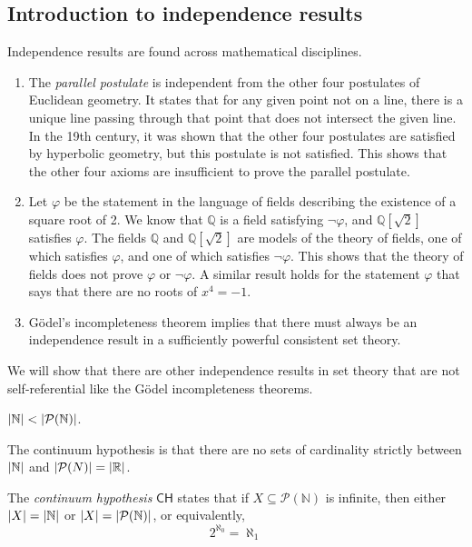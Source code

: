 \subsection{Introduction to independence results}
Independence results are found across mathematical disciplines.
\begin{enumerate}
    \item The \emph{parallel postulate} is independent from the other four postulates of Euclidean geometry.
    It states that for any given point not on a line, there is a unique line passing through that point that does not intersect the given line.
    In the 19th century, it was shown that the other four postulates are satisfied by hyperbolic geometry, but this postulate is not satisfied.
    This shows that the other four axioms are insufficient to prove the parallel postulate.
    \item Let \( \varphi \) be the statement in the language of fields describing the existence of a square root of 2.
    We know that \( \mathbb Q \) is a field satisfying \( \neg\varphi \), and \( \mathbb Q[\sqrt{2}] \) satisfies \( \varphi \).
    The fields \( \mathbb Q \) and \( \mathbb Q[\sqrt{2}] \) are models of the theory of fields, one of which satisfies \( \varphi \), and one of which satisfies \( \neg\varphi \).
    This shows that the theory of fields does not prove \( \varphi \) or \( \neg\varphi \).
    A similar result holds for the statement \( \varphi \) that says that there are no roots of \( x^4 = -1 \).
    \item G\"odel's incompleteness theorem implies that there must always be an independence result in a sufficiently powerful consistent set theory.
\end{enumerate}
We will show that there are other independence results in set theory that are not self-referential like the G\"odel incompleteness theorems.
\begin{theorem}[Cantor]
    \( \abs{\mathbb N} < \abs{\mathcal P(\mathbb N)} \).
\end{theorem}
The continuum hypothesis is that there are no sets of cardinality strictly between \( \abs{\mathbb N} \) and \( \abs{\mathcal P(N)} = \abs{\mathbb R} \).
\begin{definition}
    The \emph{continuum hypothesis} \( \mathsf{CH} \) states that if \( X \subseteq \mathcal P(\mathbb N) \) is infinite, then either \( \abs{X} = \abs{\mathbb N} \) or \( \abs{X} = \abs{\mathcal P(\mathbb N)} \), or equivalently,
    \[ 2^{\aleph_0} = \aleph_1 \]
\end{definition}
